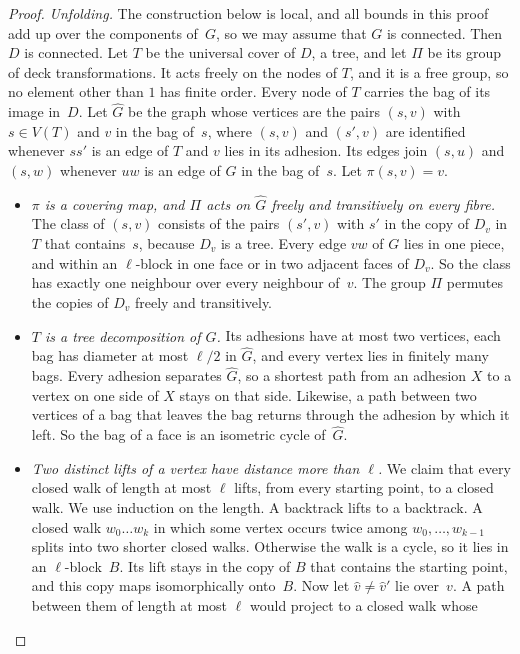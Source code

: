 \documentclass[11pt]{article}
\theoremstyle{remark}
\begin{document}
\begin{proof}
\emph{Unfolding.} The construction below is local, and all bounds in this proof add up over the
components of~$G$, so we may assume that $G$ is connected. Then $D$ is connected. Let $T$ be the
universal cover of $D$, a tree, and let $\Pi$ be its group of deck transformations. It acts freely on
the nodes of $T$, and it is a free group, so no element other than $1$ has finite order. Every node of
$T$ carries the bag of its image in~$D$. Let $\hat G$ be the graph
whose vertices are the pairs $(s,v)$ with $s\in V(T)$ and $v$ in the bag of~$s$, where $(s,v)$ and
$(s',v)$ are identified whenever $ss'$ is an edge of $T$ and $v$ lies in its adhesion. Its edges join
$(s,u)$ and $(s,w)$ whenever $uw$ is an edge of $G$ in the bag of~$s$. Let $\pi(s,v)=v$.
\begin{itemize}
\item[(i)] \emph{$\pi$ is a covering map, and $\Pi$ acts on $\hat G$ freely and transitively on every
  fibre.} The class of $(s,v)$ consists of the pairs $(s',v)$ with $s'$ in the copy of $D_v$ in $T$
  that contains~$s$, because $D_v$ is a tree. Every edge $vw$ of $G$ lies in one piece, and within an
  $\ell$-block in one face or in two adjacent faces of $D_v$. So the class has exactly one neighbour
  over every neighbour of~$v$. The group $\Pi$ permutes the copies of $D_v$ freely and transitively.
\item[(ii)] \emph{$T$ is a tree decomposition of $\hat G$.} Its adhesions have at most two vertices,
  each bag has diameter at most $\ell/2$ in $\hat G$, and every vertex lies in finitely many bags.
  Every adhesion separates $\hat G$, so a shortest path from an adhesion $X$ to a vertex on one
  side of $X$ stays on that side. Likewise, a path between two vertices of a bag that leaves the bag
  returns through the adhesion by which it left. So the bag of a face is an isometric cycle
  of~$\hat G$.
\item[(iii)] \emph{Two distinct lifts of a vertex have distance more than $\ell$.} We claim that every
  closed walk of length at most $\ell$ lifts, from every starting point, to a closed walk. We use
  induction on the length. A backtrack lifts to a backtrack. A closed walk $w_0\dots w_k$ in which
  some vertex occurs twice among $w_0,\dots,w_{k-1}$ splits into two shorter closed walks. Otherwise
  the walk is a cycle, so it lies in an $\ell$-block~$B$. Its lift stays in the copy of $B$ that
  contains the starting point, and this copy maps isomorphically onto~$B$. Now let $\hat v\ne\hat v'$
  lie over~$v$. A path between them of length at most $\ell$ would project to a closed walk whose

\end{itemize}
\end{proof}
\end{document}
